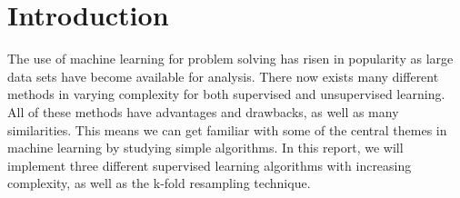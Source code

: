 \section{Introduction}
\label{sec:introduction}

The use of machine learning for problem solving has risen in popularity as large data sets have become available for analysis. There now exists many different methods in varying complexity for both supervised and unsupervised learning. All of these methods have advantages and drawbacks, as well as many similarities. This means we can get familiar with some of the central themes in machine learning by studying simple algorithms. 
In this report, we will implement three different supervised learning algorithms with increasing complexity, as well as the k-fold resampling technique.